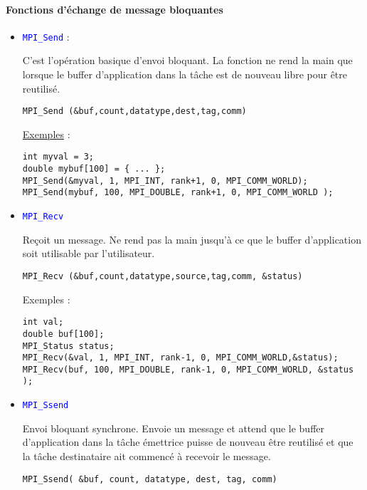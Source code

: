 \documentclass[11pt,a4paper]{article}
\begin{document}
\paragraph{Fonctions d'échange de message bloquantes}

\begin{itemize}
\item \textcolor{blue}{\texttt{MPI\_Send}} :

C'est l'opération basique d'envoi bloquant. La fonction ne rend la main que lorsque le buffer d'application dans la tâche est de nouveau libre
pour être reutilisé. 

\begin{lstlisting}[style=customcpp]
MPI_Send (&buf,count,datatype,dest,tag,comm) 
\end{lstlisting}

\underline{Exemples} :
\begin{lstlisting}[style=customcpp]
int myval = 3;
double mybuf[100] = { ... };
MPI_Send(&myval, 1, MPI_INT, rank+1, 0, MPI_COMM_WORLD);
MPI_Send(mybuf, 100, MPI_DOUBLE, rank+1, 0, MPI_COMM_WORLD );
\end{lstlisting}

\item \textcolor{blue}{\texttt{MPI\_Recv}}

Reçoit un message. Ne rend pas la main jusqu'à ce que le buffer d'application  soit utilisable par l'utilisateur.

\begin{lstlisting}[style=customcpp]
MPI_Recv (&buf,count,datatype,source,tag,comm, &status) 
\end{lstlisting}


Exemples :
\begin{lstlisting}[style=customcpp]
int val;
double buf[100];
MPI_Status status;
MPI_Recv(&val, 1, MPI_INT, rank-1, 0, MPI_COMM_WORLD,&status);
MPI_Recv(buf, 100, MPI_DOUBLE, rank-1, 0, MPI_COMM_WORLD, &status );
\end{lstlisting}

\item \textcolor{blue}{\texttt{MPI\_Ssend}}

Envoi bloquant synchrone. Envoie un message et attend que le buffer d'application dans la tâche émettrice
puisse de nouveau être reutilisé et que la tâche destinataire ait commencé à recevoir le message.

\begin{lstlisting}[style=customcpp]
MPI_Ssend( &buf, count, datatype, dest, tag, comm)
\end{lstlisting}


\end{itemize}
\end{document}
